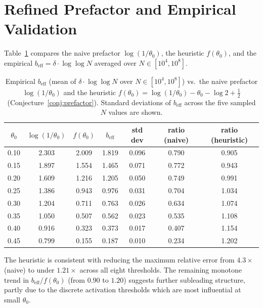 \documentclass[11pt]{article}
\theoremstyle{definition}
\begin{document}

\section{Refined Prefactor and Empirical Validation}
\label{sec:prefactor}

Table~\ref{tab:prefactor} compares the naive prefactor \(\log(1/\theta_0)\), the
heuristic \(f(\theta_0)\), and the empirical
\(b_{\mathrm{eff}} = \delta\cdot\log\log N\) averaged over \(N\in[10^4,10^8]\).

\begin{table}[ht]
\centering
\caption{Empirical \(b_{\mathrm{eff}}\) (mean of \(\delta\cdot\log\log N\) over
  \(N\in[10^4,10^8]\)) vs.\ the naive prefactor \(\log(1/\theta_0)\) and the
  heuristic \(f(\theta_0)=\log(1/\theta_0)-\theta_0-\log 2+\tfrac{1}{2}\)
  (Conjecture~\ref{conj:prefactor}).  Standard deviations of \(b_{\mathrm{eff}}\)
  across the five sampled \(N\) values are shown.}
\label{tab:prefactor}
\begin{tabular}{ccccccc}
\toprule
\(\theta_0\) & \(\log(1/\theta_0)\) & \(f(\theta_0)\) & \(b_{\mathrm{eff}}\)
  & std dev & ratio (naive) & ratio (heuristic) \\
\midrule
0.10 & 2.303 & 2.009 & 1.819 & 0.096 & 0.790 & 0.905 \\
0.15 & 1.897 & 1.554 & 1.465 & 0.071 & 0.772 & 0.943 \\
0.20 & 1.609 & 1.216 & 1.205 & 0.050 & 0.749 & 0.991 \\
0.25 & 1.386 & 0.943 & 0.976 & 0.031 & 0.704 & 1.034 \\
0.30 & 1.204 & 0.711 & 0.763 & 0.026 & 0.634 & 1.074 \\
0.35 & 1.050 & 0.507 & 0.562 & 0.023 & 0.535 & 1.108 \\
0.40 & 0.916 & 0.323 & 0.373 & 0.017 & 0.407 & 1.154 \\
0.45 & 0.799 & 0.155 & 0.187 & 0.010 & 0.234 & 1.202 \\
\bottomrule
\end{tabular}
\end{table}

The heuristic is consistent with reducing the maximum relative error from
\(4.3\times\) (naive) to under \(1.21\times\) across all eight thresholds.
The remaining monotone trend in \(b_{\mathrm{eff}}/f(\theta_0)\)
(from \(0.90\) to \(1.20\)) suggests further subleading structure, partly due to
the discrete activation thresholds which are most influential at small \(\theta_0\).
\end{document}

